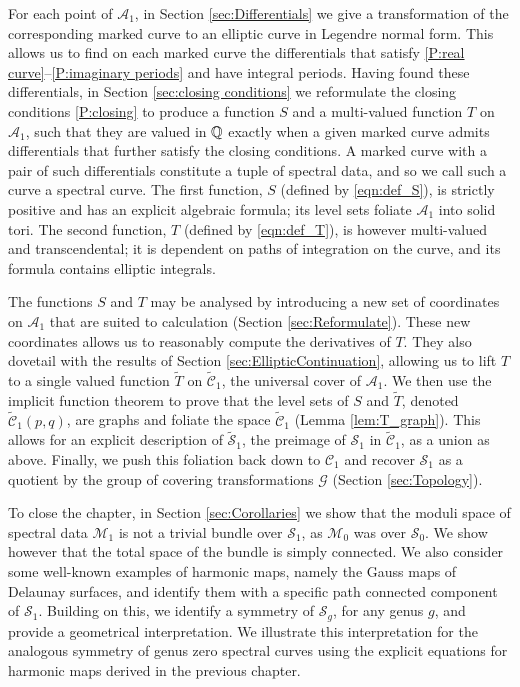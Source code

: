 For each point of $\mathcal{A}_1$, in Section \ref{sec:Differentials} we give a transformation of the corresponding marked curve to an elliptic curve in Legendre normal form. This allows us to find on each marked curve the differentials that satisfy \ref{P:real curve}--\ref{P:imaginary periods} and have integral periods. Having found these differentials, in Section \ref{sec:closing conditions} we reformulate the closing conditions \ref{P:closing} to produce a function $S$ and a multi-valued function $T$ on $\mathcal{A}_1$, such that they are valued in $\Q$ exactly when a given marked curve admits differentials that further satisfy the closing conditions. A marked curve with a pair of such differentials constitute a tuple of spectral data, and so we call such a curve a spectral curve. The first function, $S$ (defined by \eqref{eqn:def_S}), is strictly positive and has an explicit algebraic formula; its level sets foliate $\mathcal{A}_1$ into solid tori. The second function, $T$ (defined by \eqref{eqn:def_T}), is however multi-valued and transcendental; it is dependent on paths of integration on the curve, and its formula contains elliptic integrals.

The functions $S$ and $T$ may be analysed by introducing a new set of coordinates on $\mathcal{A}_1$ that are suited to calculation (Section \ref{sec:Reformulate}).
These new coordinates allows us to reasonably compute the derivatives of $T$. They also dovetail with the results of Section \ref{sec:EllipticContinuation}, allowing us to lift $T$ to a  single valued function $\tilde{T}$ on $\mathcal{\tilde{C}}_1$, the universal cover of $\mathcal{A}_1$.
We then use the implicit function theorem to prove that the level sets of $S$ and $\tilde{T}$, denoted $\mathcal{\tilde{C}}_1(p,q)$, are graphs and foliate the space $\mathcal{\tilde{C}}_1$ (Lemma \ref{lem:T_graph}). This allows for an explicit description of $\mathcal{\tilde{S}}_1$, the preimage of $\mathcal{S}_1$ in $\mathcal{\tilde{C}}_1$, as a union as above.
Finally, we push this foliation back down to $\mathcal{C}_1$ and recover $\mathcal{S}_1$ as a quotient by the group of covering transformations $\mathcal{G}$ (Section \ref{sec:Topology}).

To close the chapter, in Section \ref{sec:Corollaries} we show that the moduli space of spectral data $\mathcal{M}_1$ is not a trivial bundle over $\mathcal{S}_1$, as $\mathcal{M}_0$ was over $\mathcal{S}_0$. We show however that the total space of the bundle is simply connected. We also consider some well-known examples of harmonic maps, namely the Gauss maps of Delaunay surfaces, and identify them with a specific path connected component of $\mathcal{S}_1$. Building on this, we identify a symmetry of $\mathcal{S}_g$, for any genus $g$, and provide a geometrical interpretation. We illustrate this interpretation for the analogous symmetry of genus zero spectral curves using the explicit equations for harmonic maps derived in the previous chapter.


